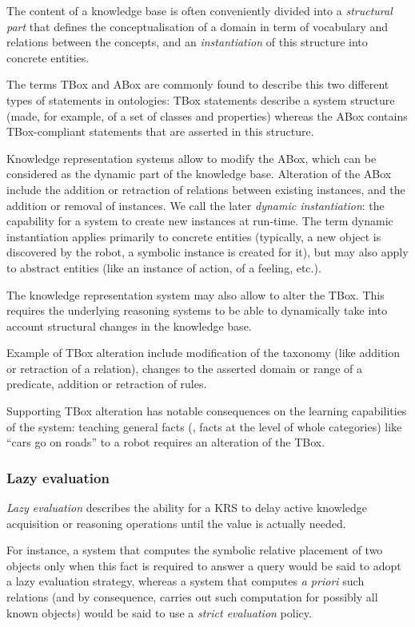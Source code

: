 The content of a knowledge base is often conveniently divided into a
\emph{structural part} that defines the conceptualisation of a domain in term
of vocabulary and relations between the concepts, and an \emph{instantiation} of
this structure into concrete entities.

The terms TBox and ABox are commonly found to describe this two different types
of statements in ontologies: TBox statements describe a system structure (made,
for example, of a set of classes and properties) whereas the ABox contains
TBox-compliant statements that are asserted in this structure.

Knowledge representation systems allow to modify the ABox, which can be
considered as the dynamic part of the knowledge base. Alteration of the ABox
include the addition or retraction of relations between existing instances,
and the addition or removal of instances. We call the later \emph{dynamic
instantiation}: the capability for a system to create new instances at
run-time. The term dynamic instantiation applies primarily to concrete entities
(typically, a new object is discovered by the robot, a symbolic instance is
created for it), but may also apply to abstract entities (like an instance of
action, of a feeling, etc.).

The knowledge representation system may also allow to alter the TBox. This
requires the underlying reasoning systems to be able to dynamically take into
account structural changes in the knowledge base.

Example of TBox alteration include modification of the taxonomy (like addition
or retraction of a  relation), changes to the asserted
domain or range of a predicate, addition or retraction of rules.

Supporting TBox alteration has notable consequences on the learning
capabilities of the system: teaching general facts (\ie, facts at the level of
whole categories) like ``cars go on roads'' to a robot requires an alteration
of the TBox.

\subsubsection{Lazy evaluation}
\label{sect|lazy-evaluation}

\emph{Lazy evaluation} describes the ability for a KRS to delay active
knowledge acquisition or reasoning operations until the value is actually
needed.

For instance, a system that computes the symbolic relative placement of two
objects only when this fact is required to answer a query would be said to
adopt a lazy evaluation strategy, whereas a system that computes {\it a priori}
such relations (and by consequence, carries out such computation for possibly
all known objects) would be said to use a \emph{strict evaluation} policy.

